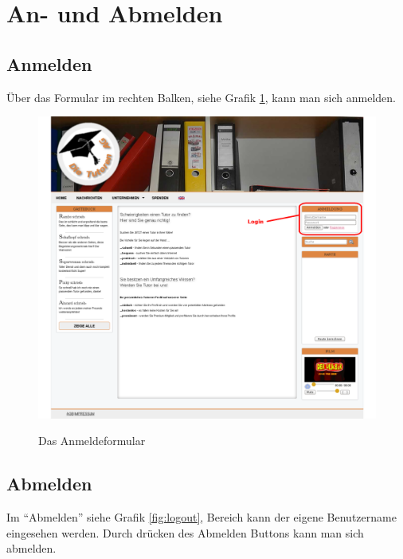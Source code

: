 \section{An- und Abmelden}

\subsection{Anmelden}

Über das Formular im rechten Balken, siehe Grafik \ref{fig:login}, kann man sich anmelden.

\begin{figure}[!htbp]
 \centering
 \includegraphics[width=1\textwidth]{../Screenshots/de/login}
 \label{fig:login}
 \caption{Das Anmeldeformular}
\end{figure}

\newpage

\subsection{Abmelden}

Im "`Abmelden"' siehe Grafik \ref{fig:logout}, Bereich kann der eigene Benutzername eingesehen werden. Durch drücken des Abmelden Buttons kann man sich abmelden.

